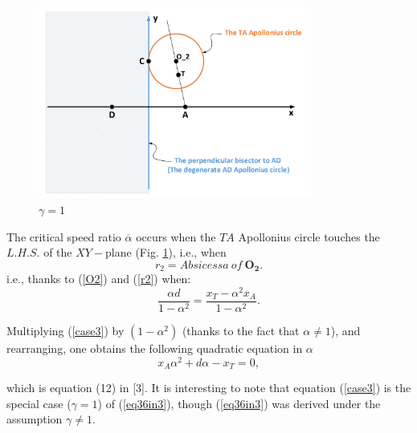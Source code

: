 \documentclass{beamer}
\begin{document}
\begin{frame}
\begin{figure}
\includegraphics[width=0.8\textwidth]{fig/drawing4_2c.pdf}
\caption {$\gamma=1$}
\label{4_g=1}
\end{figure}
\end{frame}

\begin{frame}
The critical speed ratio $\overline{\alpha}$ occurs when the $TA$ Apollonius circle touches the $L.H.S.$ of the $XY-$plane (Fig. \ref{4_g=1}), i.e., when
\begin{equation}
r_{2}= Absicessa\ of\ \boldsymbol{O_{2}}.
\end{equation} 
i.e., thanks to (\ref{O2}) and (\ref{r2}) when:
\begin{equation}
\dfrac{\alpha d}{1-\alpha^{2}}=\dfrac{x_{T}-\alpha^{2}x_{A}}{1-\alpha^{2}}.
\label{case3}
\end{equation}

Multiplying (\ref{case3}) by $(1-\alpha^{2})$ (thanks to the fact that $\alpha\neq1$), and rearranging, one obtains the following quadratic equation in $\alpha$
\begin{equation}
x_{A} \alpha^{2} + d \alpha - x_{T}=0,
\label{case3_SD}
\end{equation}

which is equation (12) in [3]. It is interesting to note that equation (\ref{case3}) is the special case ($\gamma=1$) of (\ref{eq36in3}), 
though (\ref{eq36in3}) was derived under the assumption $\gamma\neq1$.

\end{frame}
\end{document}

